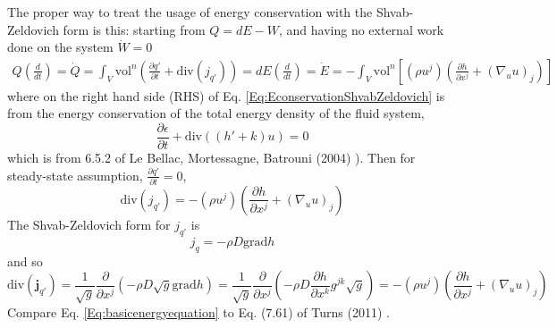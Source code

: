 \documentclass[10pt]{amsart}
\begin{document}
\begin{multicols*}{2}
The proper way to treat the usage of energy conservation with the Shvab-Zeldovich form is this: starting from $Q = dE - W$, and having no external work done on the system $\dot{W}=0$
\begin{equation}\label{Eq:EconservationShvabZeldovich}
\begin{gathered}
  Q\left( \frac{d}{dt} \right) = \dot{Q} = \int_V \text{vol}^n \left( \frac{ \partial q'}{ \partial t} + \text{div}(j_{q'}) \right) = dE\left( \frac{d}{dt} \right) = \dot{E} = -\int_V \text{vol}^n \left[ (\rho u^j) \left( \frac{ \partial h}{ \partial x^j} + (\nabla_u u)_j \right) \right]
\end{gathered}
\end{equation}
where on the right hand side (RHS) of Eq. \ref{Eq:EconservationShvabZeldovich} is from the energy conservation of the total energy density of the fluid system, 
\[
\frac{ \partial \epsilon}{ \partial t} + \text{div}((h'+k)u) = 0 
\]
which is from 6.5.2 of Le Bellac, Mortessagne, Batrouni (2004) \cite{MLeBellacFMortessagneGBatrouni2004}).  Then for steady-state assumption, $\frac{ \partial q'}{ \partial t}=0$, 
\[
\text{div}(j_{q'}) = -(\rho u^j) \left( \frac{ \partial h}{ \partial x^j} + (\nabla_u u)_j \right)
\]
The Shvab-Zeldovich form for $j_{q'}$ is
\begin{equation}
  j_q = -\rho D \text{grad}h 
\end{equation}
and so
\begin{equation}\label{Eq:basicenergyequation}
\text{div}(\mathbf{j}_{q'} ) = \frac{1}{\sqrt{g}} \frac{ \partial }{ \partial x^j} (- \rho D \sqrt{g} \text{grad}h ) = \frac{1}{\sqrt{g}} \frac{ \partial }{ \partial x^j} (-\rho D \frac{ \partial h}{ \partial x^k} g^{jk} \sqrt{g} ) = - (\rho u^j) \left( \frac{ \partial h}{ \partial x^j} + (\nabla_u u)_j \right) 
\end{equation}
Compare Eq. \ref{Eq:basicenergyequation} to Eq. (7.61) of Turns (2011) \cite{STurns2011}.  


\end{multicols*}
\end{document}
